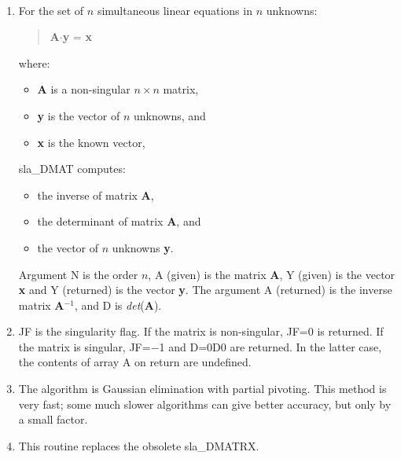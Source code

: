 {
  \\
  \\
}
{
  \\
  \\
  \\
  \\
}
\notes
{
 \begin{enumerate}
  \item For the set of $n$ simultaneous linear equations in $n$ unknowns:
        \begin{verse}
         {\bf A}$\cdot${\bf y} = {\bf x}
        \end{verse}
        where:
        \begin{itemize}
         \item {\bf A} is a non-singular $n \times n$ matrix,
         \item {\bf y} is the vector of $n$ unknowns, and
         \item {\bf x} is the known vector,
        \end{itemize}
        sla\_DMAT computes:
        \begin{itemize}
         \item the inverse of matrix {\bf A},
         \item the determinant of matrix {\bf A}, and
         \item the vector of $n$ unknowns {\bf y}.
        \end{itemize}
        Argument N is the order $n$, A (given) is the matrix {\bf A},
        Y (given) is the vector {\bf x} and Y (returned)
        is the vector {\bf y}.
        The argument A (returned) is the inverse matrix {\bf A}$^{-1}$,
        and D is {\it det}({\bf A}).
  \item JF is the singularity flag.  If the matrix is non-singular,
        JF=0 is returned.  If the matrix is singular, JF=$-$1
        and D=0D0 are returned.  In the latter case, the contents
        of array A on return are undefined.
  \item The algorithm is Gaussian elimination with partial pivoting.
        This method is very fast;  some much slower algorithms can give
        better accuracy, but only by a small factor.
  \item This routine replaces the obsolete sla\_DMATRX.
 \end{enumerate}
}
